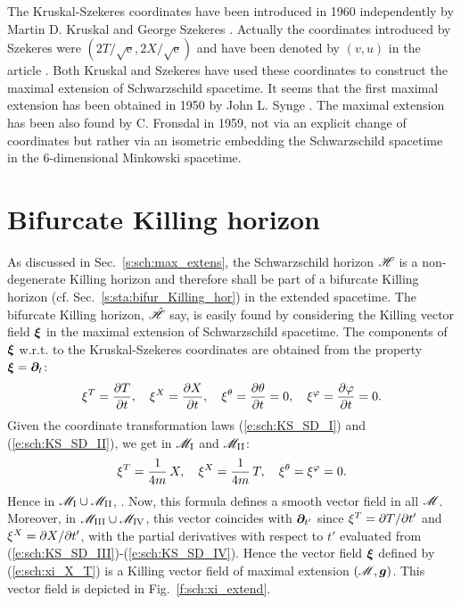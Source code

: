 \begin{hist}
The Kruskal-Szekeres coordinates have been introduced in 1960 independently
by Martin D. Kruskal \cite{Krusk60} and George Szekeres \cite{Szeke60}.
Actually the coordinates
introduced by Szekeres were $(2T/\sqrt{\mathrm{e}}, 2X/\sqrt{\mathrm{e}})$
and have been denoted by $(v,u)$ in the article \cite{Szeke60}. Both Kruskal and Szekeres
have used these coordinates to construct the maximal extension of Schwarzschild
spacetime. It seems that the first maximal extension has been obtained in 1950
by John L. Synge \cite{Synge50}.
The maximal extension has been also found by C. Fronsdal \cite{Frons59} in 1959, not via an explicit change of coordinates but rather via
an isometric embedding the Schwarzschild spacetime in the 6-dimensional Minkowski spacetime.
\end{hist}


\section{Bifurcate Killing horizon}

As discussed in Sec.~\ref{s:sch:max_extens}, the Schwarzschild horizon
$\mathscr{H}$ is
a non-degenerate Killing horizon and therefore shall be part of
a bifurcate Killing horizon (cf. Sec.~\ref{s:sta:bifur_Killing_hor})
in the extended spacetime.
The bifurcate Killing horizon, $\hat{\mathscr{H}}$ say, is easily found by
considering the Killing vector field $\bm{\xi}$ in the maximal extension
of Schwarzschild spacetime. The components of $\bm{\xi}$ w.r.t. to the
Kruskal-Szekeres coordinates are obtained from the
property $\bm{\xi} = \bm{\partial}_t$:
\[
    \xi^T = \frac{\partial T}{\partial t}, \quad
    \xi^X = \frac{\partial X}{\partial t}, \quad
    \xi^\theta = \frac{\partial \theta}{\partial t} = 0, \quad
    \xi^\varphi = \frac{\partial \varphi}{\partial t} = 0 .
\]
Given the coordinate transformation laws (\ref{e:sch:KS_SD_I})
and (\ref{e:sch:KS_SD_II}), we get in
$\mathscr{M}_{\rm I}$ and $\mathscr{M}_{\rm II}$:
\[
    \xi^T = \frac{1}{4m} \, X, \quad
    \xi^X = \frac{1}{4m} \, T , \quad
    \xi^\theta = \xi^\varphi = 0 .
\]
Hence in $\mathscr{M}_{\rm I}\cup\mathscr{M}_{\rm II}$,
\be \label{e:sch:xi_X_T}
    .
\ee
Now, this formula defines a smooth vector field in all $\mathscr{M}$.
Moreover, in $\mathscr{M}_{\rm III}\cup\mathscr{M}_{\rm IV}$, this vector coincides with
$\bm{\partial}_{t'}$ since $\xi^T = {\partial T}/{\partial t'}$ and $\xi^X = {\partial X}/{\partial t'}$,
with the partial derivatives with respect to $t'$ evaluated from
(\ref{e:sch:KS_SD_III})-(\ref{e:sch:KS_SD_IV}). Hence the vector field
$\bm{\xi}$ defined by (\ref{e:sch:xi_X_T}) is a Killing vector field
of maximal extension $(\mathscr{M},\bm{g})$. This vector field is depicted in
Fig.~\ref{f:sch:xi_extend}.


